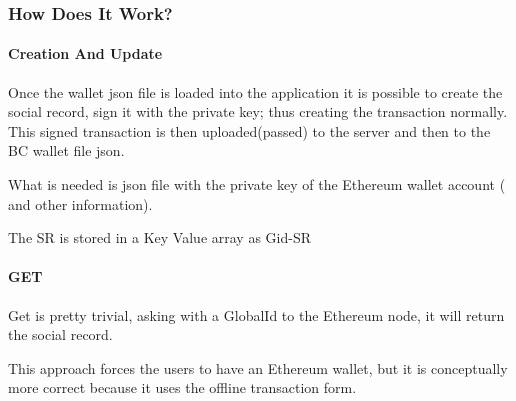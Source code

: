 \subsubsection{How Does It Work?}
\paragraph{Creation And Update}

Once the wallet json file is loaded into the application it is possible to create the social record, sign it with the private key; thus creating the transaction normally. This signed transaction is then uploaded(passed) to the server and then to the BC wallet file json.

What is needed is json file with the private key of the Ethereum wallet account ( and other information).

The SR is stored in a Key Value array as Gid-SR

\paragraph{GET}

Get is pretty trivial, asking with a GlobalId to the Ethereum node, it will return the social record.

This approach forces the users to have an Ethereum wallet, but it is conceptually more correct because it uses the offline transaction form.
